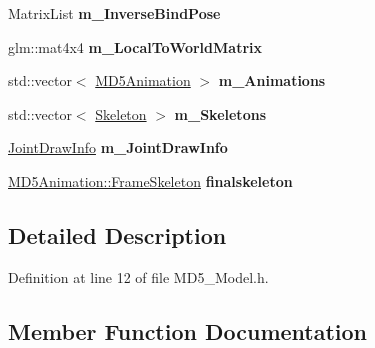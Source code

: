 \begin{DoxyCompactItemize}
\item 
Matrix\+List {\bfseries m\+\_\+\+Inverse\+Bind\+Pose}\hypertarget{class_m_d5_model_aae7f639bdc8ccb67d03e12fd7ba400c9}{}\label{class_m_d5_model_aae7f639bdc8ccb67d03e12fd7ba400c9}

\item 
glm\+::mat4x4 {\bfseries m\+\_\+\+Local\+To\+World\+Matrix}\hypertarget{class_m_d5_model_ac11ddef8bb4a07b3b81ab3167cef392e}{}\label{class_m_d5_model_ac11ddef8bb4a07b3b81ab3167cef392e}

\item 
std\+::vector$<$ \hyperlink{class_m_d5_animation}{M\+D5\+Animation} $>$ {\bfseries m\+\_\+\+Animations}\hypertarget{class_m_d5_model_a6331c1ebfb82e7970a29d5be585788c1}{}\label{class_m_d5_model_a6331c1ebfb82e7970a29d5be585788c1}

\item 
std\+::vector$<$ \hyperlink{struct_m_d5_model_1_1_skeleton}{Skeleton} $>$ {\bfseries m\+\_\+\+Skeletons}\hypertarget{class_m_d5_model_afb64972d3e609b3a43120a3b588c36d3}{}\label{class_m_d5_model_afb64972d3e609b3a43120a3b588c36d3}

\item 
\hyperlink{struct_m_d5_model_1_1_joint_draw_info}{Joint\+Draw\+Info} {\bfseries m\+\_\+\+Joint\+Draw\+Info}\hypertarget{class_m_d5_model_ab7eab806466002ca21e87ddc0a960644}{}\label{class_m_d5_model_ab7eab806466002ca21e87ddc0a960644}

\item 
\hyperlink{struct_m_d5_animation_1_1_frame_skeleton}{M\+D5\+Animation\+::\+Frame\+Skeleton} {\bfseries finalskeleton}\hypertarget{class_m_d5_model_ace1e72c079321469fc6554c3bd107463}{}\label{class_m_d5_model_ace1e72c079321469fc6554c3bd107463}

\end{DoxyCompactItemize}


\subsection{Detailed Description}


Definition at line 12 of file M\+D5\+\_\+\+Model.\+h.



\subsection{Member Function Documentation}
